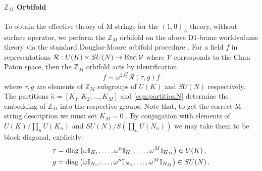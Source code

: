 \documentclass[main.tex]{subfiles}
\begin{document}
\paragraph{$\mathbb{Z}_M$ Orbifold}
To obtain the effective theory of M-strings for the $(1,0)_A$ theory, without surface operator, we perform the $\mathbb{Z}_M$ orbifold on the above D1-brane worldvolume theory via the standard Douglas-Moore orbifold procedure \cite{Douglas:1996sw}. For a field $f$ in representations $\mathcal{R}:U(K)\times SU(N)\to \operatorname{End}\mathcal{V}$ where $\mathcal{V}$ corresponds to the Chan-Paton space, then the $\mathbb{Z}_M$ orbifold acts by identification
\begin{equation}
f\sim \omega^{2J_L^R}\mathcal{R}\left(\tau,g\right)f
\end{equation}
where $\tau,g$ are elements of $\mathbb{Z}_M$ subgroups of $U(K)$ and $SU(N)$ respectively. The partitions $\tilde{\kappa}=[K_1,K_2,\dots,K_M]$ and \eqref{eqn:partitionN} determine the embedding of $\mathbb{Z}_M$ into the respective groups. Note that, to get the correct M-string description we must set $K_M=0$ \cite{Haghighat:2013tka}. By conjugation with elements of $U(K)/\prod_{n}U(K_n)$ and \newline$SU(N)/S\left(\prod_{n}U(N_n)\right)$ we may take them to be block diagonal, explicitly:
\begin{align}
&\tau=\operatorname{diag}\left(\omega\mathbb{I}_{K_{1}},\dots,\omega^n\mathbb{I}_{K_{n}},\dots,\omega^M\mathbb{I}_{K_M}\right)\in U(K)\,,\\
&g=\operatorname{diag}\left(\omega\mathbb{I}_{N_{1}},\dots,\omega^n\mathbb{I}_{N_{n}},\dots,\omega^M\mathbb{I}_{N_M}\right)\in SU(N)\,.
\end{align}
\end{document}
